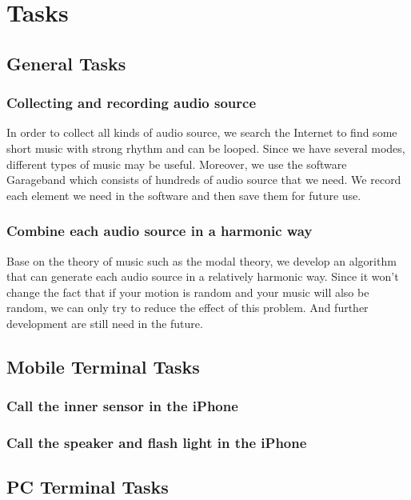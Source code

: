 \section{Tasks}
\subsection{General Tasks}
\subsubsection{Collecting and recording audio source}
In order to collect all kinds of audio source, we search the Internet to find some short music with strong rhythm and can be looped. Since we have several modes, different types of music may be useful. Moreover, we use the software Garageband which consists of hundreds of audio source that we need. We record each element we need in the software and then save them for future use.
\subsubsection{Combine each audio source in a harmonic way}
Base on the theory of music such as the modal theory, we develop an algorithm that can generate each audio source in a relatively harmonic way. Since it won’t change the fact that if your motion is random and your music will also be random, we can only try to reduce the effect of this problem. And further development are still need in the future. 
\subsection{Mobile Terminal Tasks}
\subsubsection{Call the inner sensor in the iPhone}
\subsubsection{Call the speaker and flash light in the iPhone}
\subsection{PC Terminal Tasks}
